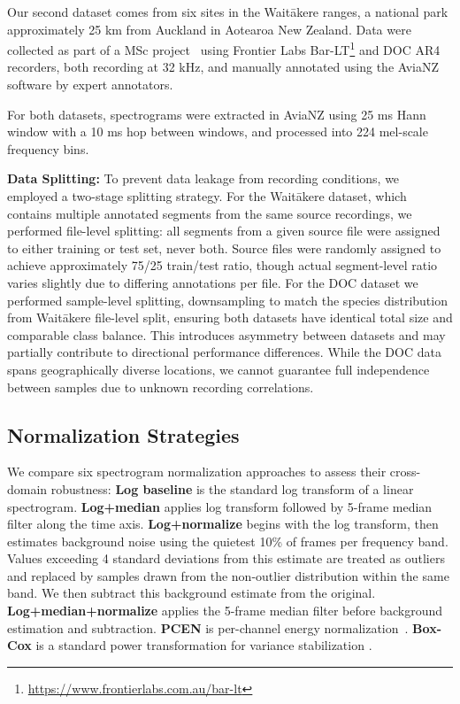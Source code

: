 \documentclass[peer-review]{fa2026}
\begin{document}
Our second dataset comes from six sites in the Wait\=akere ranges, a national park approximately 25 km from Auckland in Aotearoa New Zealand. Data were collected as part of a MSc project~\cite{JoeMsc2024} using Frontier Labs Bar-LT\footnote{\url{https://www.frontierlabs.com.au/bar-lt}} and DOC AR4 recorders, both recording at 32 kHz, and manually annotated using the AviaNZ software by expert annotators.

For both datasets, spectrograms were extracted in AviaNZ using 25 ms Hann window with a 10 ms hop between windows, and processed into 224 mel-scale frequency bins.

\textbf{Data Splitting:} To prevent data leakage from recording conditions, we employed a two-stage splitting strategy. For the Wait\=akere dataset, which contains multiple annotated segments from the same source recordings, we performed file-level splitting: all segments from a given source file were assigned to either training or test set, never both. Source files were randomly assigned to achieve approximately 75/25 train/test ratio, though actual segment-level ratio varies slightly due to differing annotations per file. For the DOC dataset we performed sample-level splitting, downsampling to match the species distribution from Wait\=akere file-level split, ensuring both datasets have identical total size and comparable class balance. This introduces asymmetry between datasets and may partially contribute to directional performance differences. While the DOC data spans geographically diverse locations, we cannot guarantee full independence between samples due to unknown recording correlations.

\subsection{Normalization Strategies}

We compare six spectrogram normalization approaches to assess their cross-domain robustness: \textbf{Log baseline} is the standard log transform of a linear spectrogram. \textbf{Log+median} applies log transform followed by 5-frame median filter along the time axis. \textbf{Log+normalize} begins with the log transform, then estimates background noise using the quietest 10\% of frames per frequency band. Values exceeding 4 standard deviations from this estimate are treated as outliers and replaced by samples drawn from the non-outlier distribution within the same band. We then subtract this background estimate from the original. \textbf{Log+median+normalize} applies the 5-frame median filter before background estimation and subtraction. \textbf{PCEN} is per-channel energy normalization~\cite{Lostanlen2019}. \textbf{Box-Cox} is a standard power transformation for variance stabilization \cite{1964_box_cox}.
\end{document}
